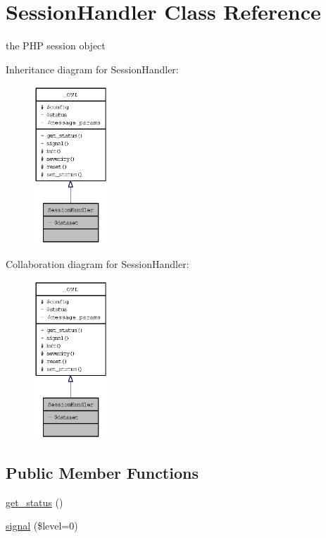\hypertarget{classSessionHandler}{
\section{SessionHandler Class Reference}
\label{classSessionHandler}
}
the PHP session object  


Inheritance diagram for SessionHandler:\nopagebreak
\begin{figure}[H]
\begin{center}
\leavevmode
\includegraphics[width=79pt]{classSessionHandler__inherit__graph}
\end{center}
\end{figure}
Collaboration diagram for SessionHandler:\nopagebreak
\begin{figure}[H]
\begin{center}
\leavevmode
\includegraphics[width=79pt]{classSessionHandler__coll__graph}
\end{center}
\end{figure}
\subsection*{Public Member Functions}
\begin{CompactItemize}
\item 
\hyperlink{class__OWL_99ec771fa2c5c279f80152cc09e489a8}{get\_\-status} ()
\item 
\hyperlink{class__OWL_61c04b80fe17e2f1e339a6d6a89e45f3}{signal} (\$level=0)
\end{CompactItemize}
